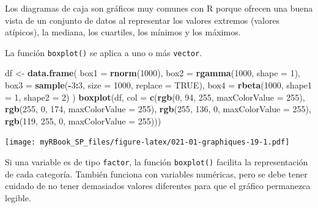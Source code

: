 \documentclass[
]{book}
\newenvironment{Shaded}{\begin{snugshade}}{\end{snugshade}}
\newcommand{\DataTypeTok}[1]{\textcolor[rgb]{0.13,0.29,0.53}{#1}}
\newcommand{\DecValTok}[1]{\textcolor[rgb]{0.00,0.00,0.81}{#1}}
\newcommand{\KeywordTok}[1]{\textcolor[rgb]{0.13,0.29,0.53}{\textbf{#1}}}
\newcommand{\NormalTok}[1]{#1}
\newcommand{\OperatorTok}[1]{\textcolor[rgb]{0.81,0.36,0.00}{\textbf{#1}}}
\newcommand{\OtherTok}[1]{\textcolor[rgb]{0.56,0.35,0.01}{#1}}
\newcommand{\StringTok}[1]{\textcolor[rgb]{0.31,0.60,0.02}{#1}}
\begin{document}
Los diagramas de caja son gráficos muy comunes con R porque ofrecen una buena vista de un conjunto de datos al representar los valores extremos (valores atípicos), la mediana, los cuartiles, los mínimos y los máximos.

La función \texttt{boxplot()} se aplica a uno o más \texttt{vector}.

\begin{Shaded}
\begin{Highlighting}[]
\NormalTok{df <-}\StringTok{ }\KeywordTok{data.frame}\NormalTok{(}
  \DataTypeTok{box1 =} \KeywordTok{rnorm}\NormalTok{(}\DecValTok{1000}\NormalTok{), }
  \DataTypeTok{box2 =} \KeywordTok{rgamma}\NormalTok{(}\DecValTok{1000}\NormalTok{, }\DataTypeTok{shape =} \DecValTok{1}\NormalTok{), }
  \DataTypeTok{box3 =} \KeywordTok{sample}\NormalTok{(}\OperatorTok{-}\DecValTok{3}\OperatorTok{:}\DecValTok{3}\NormalTok{, }\DataTypeTok{size =} \DecValTok{1000}\NormalTok{, }\DataTypeTok{replace =} \OtherTok{TRUE}\NormalTok{),}
  \DataTypeTok{box4 =} \KeywordTok{rbeta}\NormalTok{(}\DecValTok{1000}\NormalTok{, }\DataTypeTok{shape1 =} \DecValTok{1}\NormalTok{, }\DataTypeTok{shape2 =} \DecValTok{2}\NormalTok{)}
\NormalTok{)}
\KeywordTok{boxplot}\NormalTok{(df, }\DataTypeTok{col =} \KeywordTok{c}\NormalTok{(}\KeywordTok{rgb}\NormalTok{(}\DecValTok{0}\NormalTok{, }\DecValTok{94}\NormalTok{, }\DecValTok{255}\NormalTok{, }\DataTypeTok{maxColorValue =} \DecValTok{255}\NormalTok{),  }
  \KeywordTok{rgb}\NormalTok{(}\DecValTok{255}\NormalTok{, }\DecValTok{0}\NormalTok{, }\DecValTok{174}\NormalTok{, }\DataTypeTok{maxColorValue =} \DecValTok{255}\NormalTok{),  }
  \KeywordTok{rgb}\NormalTok{(}\DecValTok{255}\NormalTok{, }\DecValTok{136}\NormalTok{, }\DecValTok{0}\NormalTok{, }\DataTypeTok{maxColorValue =} \DecValTok{255}\NormalTok{),  }
  \KeywordTok{rgb}\NormalTok{(}\DecValTok{119}\NormalTok{, }\DecValTok{255}\NormalTok{, }\DecValTok{0}\NormalTok{, }\DataTypeTok{maxColorValue =} \DecValTok{255}\NormalTok{)))}
\end{Highlighting}
\end{Shaded}

\texttt{[image: myRBook\_SP\_files/figure-latex/021-01-graphiques-19-1.pdf]}

Si una variable es de tipo \texttt{factor}, la función \texttt{boxplot()} facilita la representación de cada categoría. También funciona con variables numéricas, pero se debe tener cuidado de no tener demasiados valores diferentes para que el gráfico permanezca legible.
\end{document}
